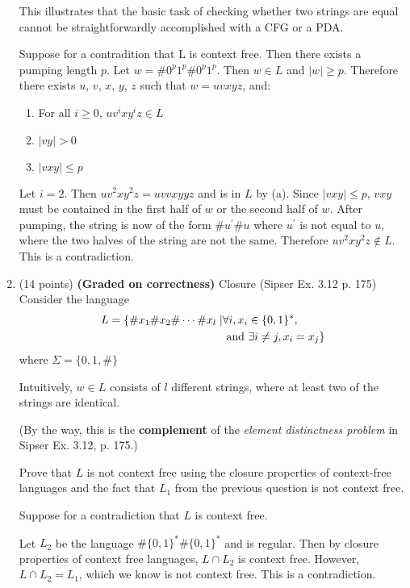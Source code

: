 \documentclass{article}
\theoremstyle{definition}
\newenvironment {solution}
{
\begin{tcolorbox}
}
{
\end{tcolorbox}
}
\begin{document}
\begin{enumerate}
    This illustrates that the basic task of checking whether two strings are equal cannot be straightforwardly accomplished with a CFG or a PDA.

    \begin{solution}
        Suppose for a contradition that L is context free. Then there exists a 
        pumping length $p$. Let $w = \#0^p1^p\#0^p1^p$. Then $w \in L$ and $|w| \geq p$.
        Therefore there exists $u$, $v$, $x$, $y$, $z$ such that $w = uvxyz$, and:
        \begin{enumerate}
            \item For all $i \geq 0$, $uv^ixy^iz \in L$
            \item $|vy| > 0$
            \item $|vxy| \leq p$
        \end{enumerate}
        Let $i = 2$. Then $uv^2xy^2z = uvvxyyz$ and is in $L$ by (a). Since $|vxy|
        \leq p$, $vxy$ must be contained in the first half of $w$ or the second half of $w$. 
        After pumping, the string is now of the form $\#u^{'}\#u$ where $u^{'}$ 
        is not equal to $u$, where the two halves of the string are not the same. 
        Therefore $uv^2xy^2z \notin L$. This is a contradiction.
    \end{solution}
    
    \item (14 points) \textbf{(Graded on correctness)} Closure
    (Sipser Ex. 3.12 p. 175)
    Consider the language
    \begin{align*}
    L = \{\#x_1\#x_2\#\cdots \#x_l \mid & \forall i, x_i \in \{0,1\}^*, \\ 
    &\textnormal{ and } \exists i\neq j, x_i = x_j \}
    \end{align*}
    where $\Sigma = \{0, 1, \#\}$

    Intuitively, $w \in L$ consists of $l$ different strings, where at least two of the strings are identical.

    (By the way, this is the \textbf{complement} of the \emph{element distinctness problem} in Sipser Ex. 3.12, p. 175.)
    
    Prove that $L$ is not context free using the closure properties of context-free languages and the fact that $L_1$ from the previous question is not context free.

    \begin{solution}
        Suppose for a contradiction that $L$ is context free. 
        
        Let $L_2$ be the language $\#\{0, 1\}^*\#\{0, 1\}^*$ and is regular. 
        Then by closure properties of context free languages, 
        $L \cap L_2$ is context free. However, $L \cap L_2 = L_1$, which we 
        know is not context free. This is a contradiction.
    \end{solution}

\end{enumerate}
\end{document}

